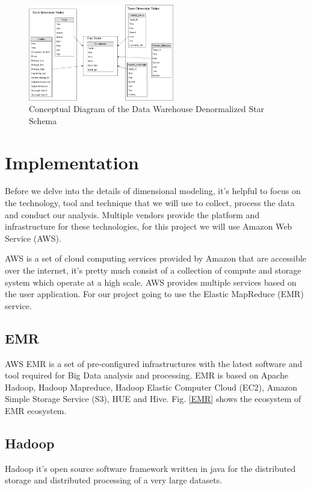 \documentclass[journal]{IEEEtran}
\begin{document}
\begin{figure}
	\centering
	\includegraphics[width=2.5in]{Star_Conceptual_Schema.png}
	\caption{Conceptual Diagram of the Data Warehouse 
		Denormalized Star Schema}
	\label{star}
\end{figure}

\section{Implementation}

Before we delve into the details of dimensional modeling, it's helpful to focus on the technology, tool and technique that we will use to collect, process the data and conduct our analysis. Multiple vendors provide the platform and infrastructure for these technologies, for this project we will use Amazon Web Service (AWS).

AWS is a set of cloud computing services provided by Amazon that are accessible over the internet, it’s pretty much consist of a collection of compute and storage system which operate at a high scale. AWS provides multiple services based on the user application. For our project going to use the Elastic MapReduce (EMR) service.

\subsection{EMR}

AWS EMR is a set of pre-configured infrastructures with the latest software and tool required for Big Data analysis and processing. EMR is based on Apache Hadoop, Hadoop Mapreduce, Hadoop Elastic Computer Cloud (EC2), Amazon Simple Storage Service (S3), HUE and Hive. Fig. \ref{EMR} shows the ecosystem of EMR ecosystem.

\subsection{Hadoop}

Hadoop it’s open source software framework written in java for the distributed storage and distributed processing of a very large datasets.
\end{document}
